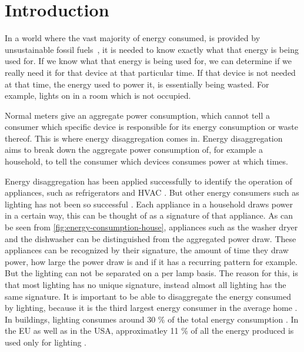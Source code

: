 
\chapter{Introduction}
\label{chp:introduction}

\vspace{1\baselineskip}

\noindent


In a world where the vast majority of energy consumed, is provided by unsustainable fossil fuels~\cite{kolter2011redd}, it is needed to know exactly what that energy is being used for. 
If we know what that energy is being used for, we can determine if we really need it for that device at that particular time.
If that device is not needed at that time, the energy used to power it, is essentially being wasted.
For example, lights on in a room which is not occupied.



Normal meters give an aggregate power consumption, which cannot tell a consumer which specific device is responsible for its energy consumption or waste thereof.
This is where energy disaggregation comes in.
Energy disaggregation aims to break down the aggregate power consumption of, for example a household, to tell the consumer which devices consumes power at which times.




Energy disaggregation has been applied successfully to identify the operation of appliances, such as refrigerators and HVAC \cite{kolter2011redd} \cite{spiegel2014energy}.
But other energy consumers such as lighting has not been so successful \cite{spiegel2014energy} \cite{batra2015neighbourhood}.
Each appliance in a household draws power in a certain way, this can be thought of as a signature of that appliance.
As can be seen from \autoref{fig:energy-consumption-house}, appliances such as the washer dryer and the dishwasher can be distinguished from the aggregated power draw.
These appliances can be recognized by their signature, the amount of time they draw power, how large the power draw is and if it has a recurring pattern for example.
But the lighting can not be separated on a per lamp basis.
The reason for this, is that most lighting has no unique signature, instead almost all lighting has the same signature.
It is important to be able to disaggregate the energy consumed by lighting, because it is the third largest energy consumer in the average home \cite{batra2015neighbourhood}.
In buildings, lighting consumes around 30 \% of the total energy consumption \cite{halonen2010guidebook}.
In the EU as well as in the USA, approximatley 11 \% of all the energy produced is used only for lighting \cite{bertoldi2009electricity} \cite{outlook2010energy}.

